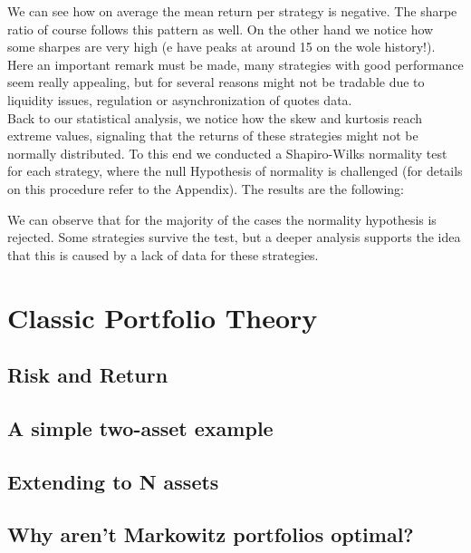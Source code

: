 \documentclass[12pt]{article} %
\numberwithin{equation}{subsection}
\begin{document}
We can see how on average the mean return per strategy is negative. The sharpe ratio of course follows this pattern as well. On the other hand we notice how some sharpes are very high (e have peaks at around 15 on the wole history!). Here an important remark must be made, many strategies with good performance seem really appealing, but for several reasons might not be tradable due to liquidity issues, regulation or asynchronization of quotes data.\\
Back to our statistical analysis, we notice how the skew and kurtosis reach extreme values, signaling that the returns of these strategies might not be normally distributed. To this end we conducted a Shapiro-Wilks normality test for each strategy, where the null Hypothesis of normality is challenged (for details on this procedure refer to the Appendix). The results are the following:

We can observe that for the majority of the cases the normality hypothesis is rejected. Some strategies survive the test, but a deeper analysis supports the idea that this is caused by a lack of data for these strategies. 


\section{Classic Portfolio Theory}

\subsection{Risk and Return}



\subsection{A simple two-asset example}



\subsection{Extending to N assets}




\subsection{Why aren't Markowitz portfolios optimal?}
\end{document}
